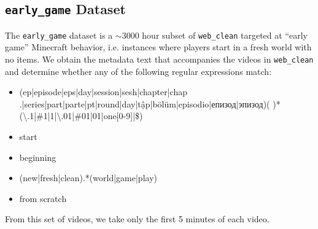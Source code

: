 \subsection{\texttt{early\_game} Dataset}
 \label{appendix:early_game_data}
The \texttt{early\_game} dataset is a $\sim$3000 hour subset of \texttt{web\_clean} targeted at ``early game'' Minecraft behavior, i.e. instances where players start in a fresh world with no items. We obtain the metadata text that accompanies the videos in \texttt{web\_clean} and determine whether any of the following regular expressions match:
\begin{itemize}
    \item (ep|episode|eps|day|session|sesh|chapter|chap\\.|series|part|parte|pt|round|day|t\d{\^{a}}p|b\"ol\"um|episodio|\sffamily\foreignlanguage{russian}{епизод}|\sffamily\foreignlanguage{russian}{эпизод})( )*(\textbackslash.1|\#1|1|\textbackslash.01|\#01|01|one[\hspace{1.5px}$\hat{ }$\hspace{1.5px}0-9]|\$)
    \item start
    \item beginning
    \item (new|fresh|clean).*(world|game|play)
    \item from scratch
\end{itemize}
From this set of videos, we take only the first 5 minutes of each video.